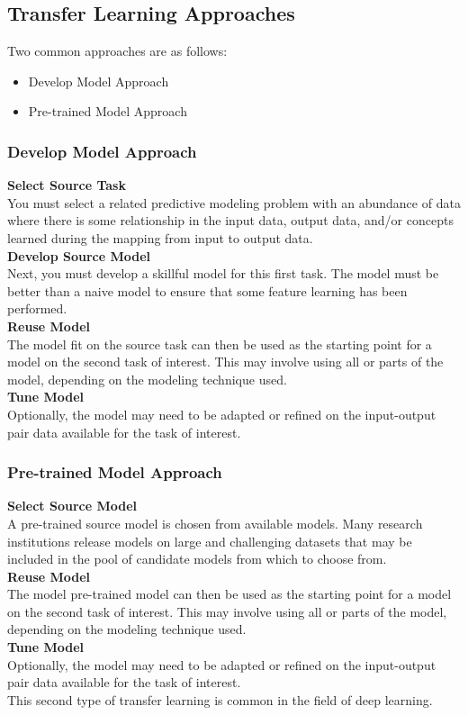 \subsection{Transfer Learning Approaches}
Two common approaches are as follows:
\begin{itemize}
    \item Develop Model Approach
    \item Pre-trained Model Approach
\end{itemize}
\subsubsection{Develop Model Approach}
\textbf{Select Source Task}\\ You must select a related predictive modeling problem with an abundance of data where there is some relationship in the input data, output data, and/or concepts learned during the mapping from input to output data.\\
\textbf{Develop Source Model}\\ Next, you must develop a skillful model for this first task. The model must be better than a naive model to ensure that some feature learning has been performed.\\
\textbf{Reuse Model}\\ The model fit on the source task can then be used as the starting point for a model on the second task of interest. This may involve using all or parts of the model, depending on the modeling technique used.\\
\textbf{Tune Model}\\ Optionally, the model may need to be adapted or refined on the input-output pair data available for the task of interest.\\
\subsubsection{Pre-trained Model Approach}
\textbf{Select Source Model}\\ A pre-trained source model is chosen from available models. Many research institutions release models on large and challenging datasets that may be included in the pool of candidate models from which to choose from. \\
\textbf{Reuse Model}\\ The model pre-trained model can then be used as the starting point for a model on the second task of interest. This may involve using all or parts of the model, depending on the modeling technique used. \\
\textbf{Tune Model}\\ Optionally, the model may need to be adapted or refined on the input-output pair data available for the task of interest.\\
This second type of transfer learning is common in the field of deep learning. \\

